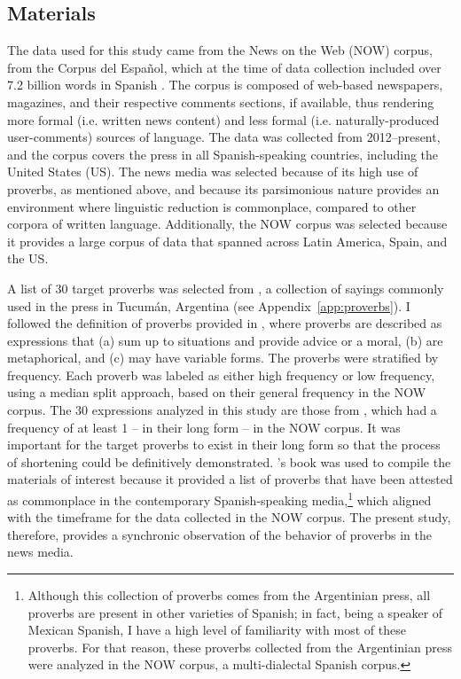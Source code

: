 \documentclass[output=paper,colorlinks,citecolor=brown,draftmode]{langscibook}
\begin{document}
\subsection{Materials}

The data used for this study came from the News on the Web (NOW) corpus, from the Corpus del Espa{\~n}ol, which at the time of data collection included over 7.2 billion words in Spanish \citep{davies2016now}. The corpus is composed of web-based newspapers, magazines, and their respective comments sections, if available, thus rendering more formal (i.e. written news content) and less formal (i.e. naturally-produced user-comments) sources of language. The data was collected from 2012--present, and the corpus covers the press in all Spanish-speaking countries, including the United States (US). The news media was selected because of its high use of proverbs, as mentioned above, and because its parsimonious nature provides an environment where linguistic reduction is commonplace, compared to other corpora of written language. Additionally, the NOW corpus was selected because it provides a large corpus of data that spanned across Latin America, Spain, and the US.

A list of 30 target proverbs was selected from \citet{pedicone2004refranero}, a collection of sayings commonly used in the press in Tucum{\'a}n, Argentina (see Appendix~\ref{app:proverbs}). I followed the definition of proverbs provided in \citet{gramley1992survey}, where proverbs are described as expressions that (a) sum up to situations and provide advice or a moral, (b) are metaphorical, and (c) may have variable forms.  The proverbs were stratified by frequency. Each proverb was labeled as either high frequency or low frequency, using a median split approach, based on their general frequency in the NOW corpus. The 30 expressions analyzed in this study are those from \citet{pedicone2004refranero}, which had a frequency of at least 1 -- in their long form -- in the NOW corpus. It was important for the target proverbs to exist in their long form so that the process of shortening could be definitively demonstrated. \citeauthor{pedicone2004refranero}'s book was used to compile the materials of interest because it provided a list of proverbs that have been attested as commonplace in the contemporary Spanish-speaking media,\footnote{Although this collection of proverbs comes from the Argentinian press, all proverbs are present in other varieties of Spanish; in fact, being a speaker of Mexican Spanish, I have a high level of familiarity with most of these proverbs. For that reason, these proverbs collected from the Argentinian press were analyzed in the NOW corpus, a multi-dialectal Spanish corpus.} which aligned with the timeframe for the data collected in the NOW corpus. The present study, therefore, provides a synchronic observation of the behavior of proverbs in the news media.
\end{document}
